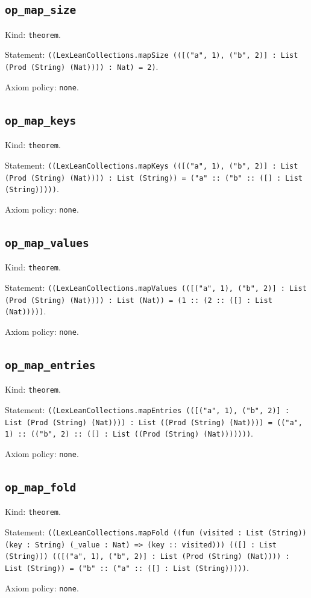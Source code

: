 \documentclass[11pt]{article}
\begin{document}
\subsection*{\texttt{op\_map\_size}}
\noindent Kind: \texttt{theorem}.\par
\noindent Statement: \texttt{((LexLeanCollections.mapSize (([("a", 1), ("b", 2)] : List (Prod (String) (Nat)))) : Nat) = 2)}.\par
\noindent Axiom policy: \texttt{none}.\par
\subsection*{\texttt{op\_map\_keys}}
\noindent Kind: \texttt{theorem}.\par
\noindent Statement: \texttt{((LexLeanCollections.mapKeys (([("a", 1), ("b", 2)] : List (Prod (String) (Nat)))) : List (String)) = ("a" :: ("b" :: ([] : List (String)))))}.\par
\noindent Axiom policy: \texttt{none}.\par
\subsection*{\texttt{op\_map\_values}}
\noindent Kind: \texttt{theorem}.\par
\noindent Statement: \texttt{((LexLeanCollections.mapValues (([("a", 1), ("b", 2)] : List (Prod (String) (Nat)))) : List (Nat)) = (1 :: (2 :: ([] : List (Nat)))))}.\par
\noindent Axiom policy: \texttt{none}.\par
\subsection*{\texttt{op\_map\_entries}}
\noindent Kind: \texttt{theorem}.\par
\noindent Statement: \texttt{((LexLeanCollections.mapEntries (([("a", 1), ("b", 2)] : List (Prod (String) (Nat)))) : List ((Prod (String) (Nat)))) = (("a", 1) :: (("b", 2) :: ([] : List ((Prod (String) (Nat)))))))}.\par
\noindent Axiom policy: \texttt{none}.\par
\subsection*{\texttt{op\_map\_fold}}
\noindent Kind: \texttt{theorem}.\par
\noindent Statement: \texttt{((LexLeanCollections.mapFold ((fun (visited : List (String)) (key : String) (\_value : Nat) => (key :: visited))) (([] : List (String))) (([("a", 1), ("b", 2)] : List (Prod (String) (Nat)))) : List (String)) = ("b" :: ("a" :: ([] : List (String)))))}.\par
\noindent Axiom policy: \texttt{none}.\par
\end{document}
